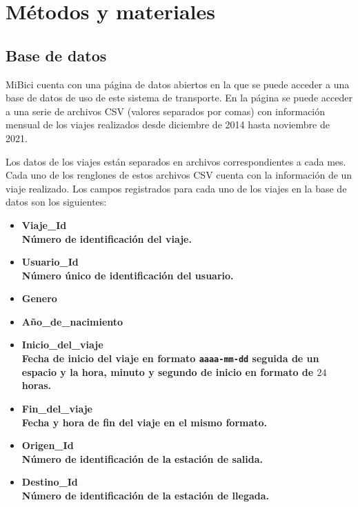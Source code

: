 \section{Métodos y materiales}

\subsection{Base de datos}

MiBici cuenta con una página de datos abiertos en la que se puede acceder a una base de datos de uso de este sistema de transporte\cite{mibici_data}. En la página se puede acceder a una serie de archivos CSV (valores separados por comas) con información mensual de los viajes realizados desde diciembre de 2014 hasta noviembre de 2021.

Los datos de los viajes están separados en archivos correspondientes a cada mes. Cada uno de los renglones de estos archivos CSV cuenta con la información de un viaje realizado. Los campos registrados para cada uno de los viajes en la base de datos son los siguientes:

\begin{itemize}
    \item \bfseries{Viaje\_Id }\normalfont \\ Número de identificación del viaje.
    \item \bfseries{Usuario\_Id }\normalfont\\ Número único de identificación del usuario.
    \item \bfseries{Genero }\normalfont
    \item \bfseries{Año\_de\_nacimiento }
    \item \bfseries{Inicio\_del\_viaje} \normalfont \\ Fecha de inicio del viaje en formato \lstinline|aaaa-mm-dd| seguida de un espacio y la hora, minuto y segundo de inicio en formato de $24$ horas.
    \item \bfseries{Fin\_del\_viaje }\normalfont \\ Fecha y hora de fin del viaje en el mismo formato.
    \item \bfseries{Origen\_Id }\normalfont \\ Número de identificación de la estación de salida.
    \item \bfseries{Destino\_Id }\normalfont \\ Número de identificación de la estación de llegada.
\end{itemize}

